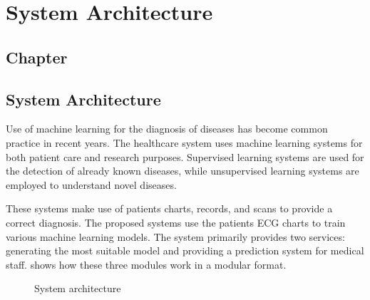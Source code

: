 \thispagestyle{fancy}
\chapter{System Architecture} \label{ch:system_architecture}
\section*{\centering Chapter \thechapter}
\section*{\centering System Architecture}

Use of machine learning for the diagnosis of diseases has become common practice in recent years. The healthcare system uses machine learning systems for both patient care and research purposes. Supervised learning systems are used for the detection of already known diseases, while unsupervised learning systems are employed to understand novel diseases.

These systems make use of patients charts, records, and scans to provide a correct diagnosis. The proposed systems use the patients ECG charts to train various machine learning models. The system primarily provides two services: generating the most suitable model and providing a prediction system for medical staff.  shows how these three modules work in a modular format.

\begin{figure}[H]
  \centering
  \caption{System architecture}
  \label{fig:system_architecture}
\end{figure}

